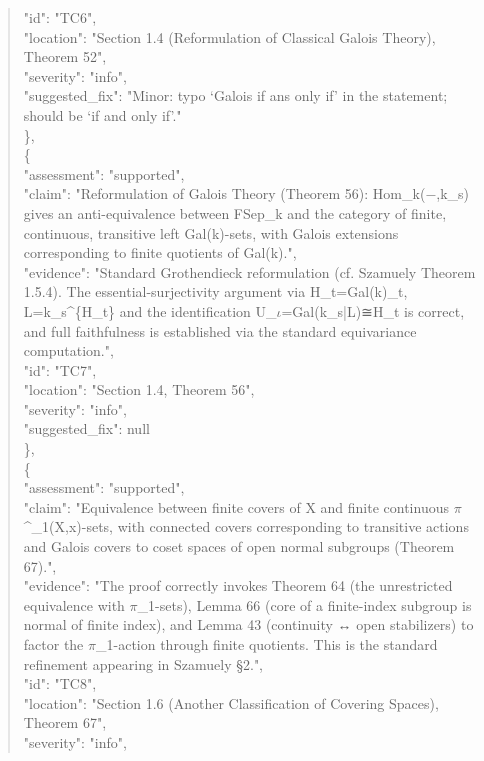 \documentclass[11pt]{article}
\begin{document}
\begin{quote}
      "id": "TC6",\\
      "location": "Section 1.4 (Reformulation of Classical Galois Theory), Theorem 52",\\
      "severity": "info",\\
      "suggested\_fix": "Minor: typo ‘Galois if ans only if’ in the statement; should be ‘if and only if’."\\
    \},\\
    \{\\
      "assessment": "supported",\\
      "claim": "Reformulation of Galois Theory (Theorem 56): Hom\_k(\ensuremath{-},k\_s) gives an anti-equivalence between FSep\_k and the category of finite, continuous, transitive left Gal(k)-sets, with Galois extensions corresponding to finite quotients of Gal(k).",\\
      "evidence": "Standard Grothendieck reformulation (cf. Szamuely Theorem 1.5.4). The essential-surjectivity argument via H\_t=Gal(k)\_t, L=k\_s\^{}\{H\_t\} and the identification U\_\ensuremath{\iota}=Gal(k\_s|L)≅H\_t is correct, and full faithfulness is established via the standard equivariance computation.",\\
      "id": "TC7",\\
      "location": "Section 1.4, Theorem 56",\\
      "severity": "info",\\
      "suggested\_fix": null\\
    \},\\
    \{\\
      "assessment": "supported",\\
      "claim": "Equivalence between finite covers of X and finite continuous \ensuremath{\pi}\^{}\_1(X,x)-sets, with connected covers corresponding to transitive actions and Galois covers to coset spaces of open normal subgroups (Theorem 67).",\\
      "evidence": "The proof correctly invokes Theorem 64 (the unrestricted equivalence with \ensuremath{\pi}\_1-sets), Lemma 66 (core of a finite-index subgroup is normal of finite index), and Lemma 43 (continuity ↔ open stabilizers) to factor the \ensuremath{\pi}\_1-action through finite quotients. This is the standard refinement appearing in Szamuely §2.",\\
      "id": "TC8",\\
      "location": "Section 1.6 (Another Classification of Covering Spaces), Theorem 67",\\
      "severity": "info",\\

\end{quote}
\end{document}
